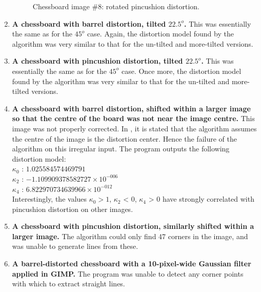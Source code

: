 \begin{enumerate}
\begin{figure}[H]
  \caption{Chessboard image \#8: rotated pincushion distortion.}
  \label{fig:chess-8}
\end{figure}
  \item \textbf{A chessboard with barrel distortion, tilted $22.5^o$.} This was essentially the same as for the $45^o$ case. Again, the distortion model found by the algorithm was very similar to that for the un-tilted and more-tilted versions.
  \item \textbf{A chessboard with pincushion distortion, tilted $22.5^o$.} This was essentially the same as for the $45^o$ case. Once more, the distortion model found by the algorithm was very similar to that for the un-tilted and more-tilted versions.
  \item \textbf{A chessboard with barrel distortion, shifted within a larger image so that the centre of the board was not near the image centre.} This image was not properly corrected. In \cite{algebraic-distortion}, it is stated that the algorithm assumes the centre of the image is the distortion center. Hence the failure of the algorithm on this irregular input. The program outputs the following distortion model:\\
   $ \kappa_{0}$ : $1.025584574469791$\\
   $ \kappa_{2}$ : $-1.109909378582727 \times 10^{-006}$\\
   $ \kappa_{4}$ : $6.822970734639966 \times 10^{-012}$\\
   Interestingly, the values $\kappa_{0} > 1$, $\kappa_{2}$ < 0, $\kappa_{4}$ > 0 have strongly correlated with pincushion distortion on other images.
  \item \textbf{A chessboard with pincushion distortion, similarly shifted within a larger image.} The algorithm could only find 47 corners in the image, and was unable to generate lines from these.
  \item \textbf{A barrel-distorted chessboard with a 10-pixel-wide Gaussian filter applied in GIMP.} The program was unable to detect any corner points with which to extract straight lines.

\end{enumerate}
